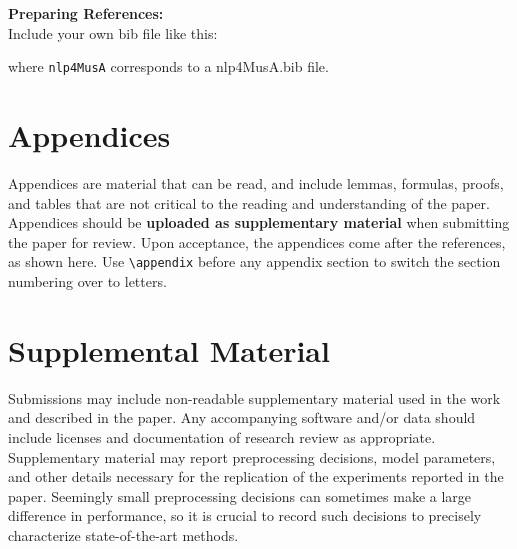 \documentclass[11pt,a4paper]{article}
\begin{document}
\noindent \textbf{Preparing References:} \\
Include your own bib file like this:
\verb||
\verb|| 

where \verb|nlp4MusA| corresponds to a nlp4MusA.bib file.




\appendix

\section{Appendices}
\label{sec:appendix}
Appendices are material that can be read, and include lemmas, formulas, proofs, and tables that are not critical to the reading and understanding of the paper. 
Appendices should be \textbf{uploaded as supplementary material} when submitting the paper for review. Upon acceptance, the appendices come after the references, as shown here. Use
\verb|\appendix| before any appendix section to switch the section
numbering over to letters.


\section{Supplemental Material}
\label{sec:supplemental}
Submissions may include non-readable supplementary material used in the work and described in the paper. Any accompanying software and/or data should include licenses and documentation of research review as appropriate. Supplementary material may report preprocessing decisions, model parameters, and other details necessary for the replication of the experiments reported in the paper. Seemingly small preprocessing decisions can sometimes make a large difference in performance, so it is crucial to record such decisions to precisely characterize state-of-the-art methods. 
\end{document}
